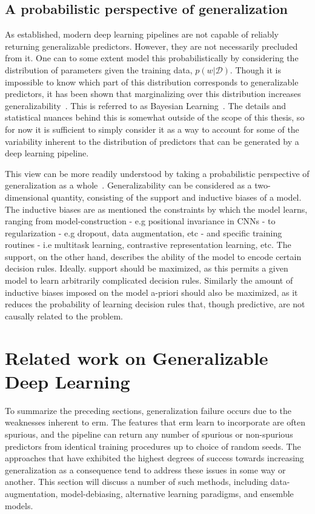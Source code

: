 	\subsection{A probabilistic perspective of generalization} \label{probpersp}
	As established, modern deep learning pipelines are not capable of reliably returning generalizable predictors. However, they are not necessarily precluded from it. One can to some extent model this probabilistically by considering the distribution of parameters given the training data, \(p(w | \mathcal{D})\). Though it is impossible to know which part of this distribution corresponds to generalizable predictors, it has been shown that marginalizing over this distribution increases generalizability~\cite{bayesian_generalization,endoensemble,divergentnets,ensemble_machinereading}. This is referred to as Bayesian Learning~\cite{bayesian_case}. The details and statistical nuances behind this is somewhat outside of the scope of this thesis, so for now it is sufficient to simply consider it as a way to account for some of the variability inherent to the distribution of predictors that can be generated by a deep learning pipeline. 

	This view can be more readily understood by taking a probabilistic perspective of generalization as a whole~\cite{bayesian_generalization}. Generalizability can be considered as a two-dimensional quantity, consisting of the support and inductive biases of a model. The inductive biases are as mentioned the constraints by which the model learns, ranging from model-construction - e.g positional invariance in CNNs - to regularization - e.g dropout, data augmentation, etc - and specific training routines - i.e multitask learning, contrastive representation learning, etc. The support, on the other hand, describes the ability of the model to encode certain decision rules. Ideally. support should be maximized, as this permits a given model to learn arbitrarily complicated decision rules. Similarly the amount of inductive biases imposed on the model a-priori should also be maximized, as it reduces the probability of learning decision rules that, though predictive, are not causally related to the problem. 

\section{Related work on Generalizable Deep Learning}
To summarize the preceding sections, generalization failure occurs due to the weaknesses inherent to \gls{erm}. The features that \gls{erm} learn to incorporate are often spurious, and the pipeline can return any number of spurious or non-spurious predictors from identical training procedures up to choice of random seeds. The approaches that have exhibited the highest degrees of success towards increasing generalization as a consequence tend to address these issues in some way or another. This section will discuss a number of such methods, including data-augmentation, model-debiasing, alternative learning paradigms, and ensemble models.


